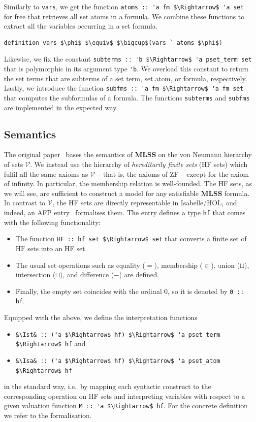 \documentclass[runningheads]{llncs}
\newcommand{\MLSS}{\textbf{MLSS}}
\newcommand{\Ist}{I$_\text{st}$}
\newcommand{\Isa}{I$_\text{sa}$}
\newcommand{\hfmem}{\boldsymbol{\in}}
\begin{document}
Similarly to \lstinline!vars!, we get the function \lstinline!atoms :: 'a fm $\Rightarrow$ 'a set! for free that retrieves all set atoms in a formula.
We combine these functions to extract all the variables occurring in a set formula.
\begin{lstlisting}
definition vars $\phi$ $\equiv$ $\bigcup$(vars ` atoms $\phi$)
\end{lstlisting}

Likewise, we fix the constant \lstinline!subterms :: 'b $\Rightarrow$ 'a pset_term set! that is polymorphic in its argument type \lstinline!'b!.
We overload this constant to return the set terms that are subterms of a set term, set atom, or formula, respectively.
Lastly, we introduce the function \lstinline!subfms :: 'a fm $\Rightarrow$ 'a fm set! that computes the subformulas of a formula.
The functions \lstinline!subterms! and \lstinline!subfms! are implemented in the expected way.

\subsection{Semantics}
The original paper~\cite{new_fast_tableau} bases the semantics of \MLSS{} on the von Neumann hierarchy of sets $\mathcal{V}$.
We instead use the hierarchy of \emph{hereditarily finite sets} (HF sets) which fulfil all the same axioms as $\mathcal{V}$ -- that is, the axioms of ZF -- except for the axiom of infinity.
In particular, the membership relation is well-founded.
The HF sets, as we will see, are sufficient to construct a model for any satisfiable \MLSS{} formula.
In contrast to $\mathcal{V}$, the HF sets are directly representable in Isabelle/HOL, and indeed, an AFP entry~\cite{hf_AFP} formalises them.
The entry defines a type \lstinline!hf! that comes with the following functionality:
\begin{itemize}
  \item The function \lstinline!HF :: hf set $\Rightarrow$ set! that converts a finite set of HF sets into an HF set.
\item The usual set operations such as equality ($=$), membership ($\hfmem$), union ($\sqcup$), intersection ($\sqcap$), and difference ($-$) are defined.
\item Finally, the empty set coincides with the ordinal $0$, so it is denoted by \lstinline!0 :: hf!.
\end{itemize}

Equipped with the above, we define the interpretation functions 
\begin{itemize}
  \item \lstinline!&\Ist& :: ('a $\Rightarrow$ hf) $\Rightarrow$ 'a pset_term $\Rightarrow$ hf! and 
  \item \lstinline!&\Isa& :: ('a $\Rightarrow$ hf) $\Rightarrow$ 'a pset_atom $\Rightarrow$ hf!
\end{itemize}
in the standard way, i.e.\ by mapping each syntactic construct to the corresponding operation on HF sets and interpreting variables with respect to a given valuation function \lstinline!M :: 'a $\Rightarrow$ hf!.
For the concrete definition we refer to the formalisation.
\end{document}
